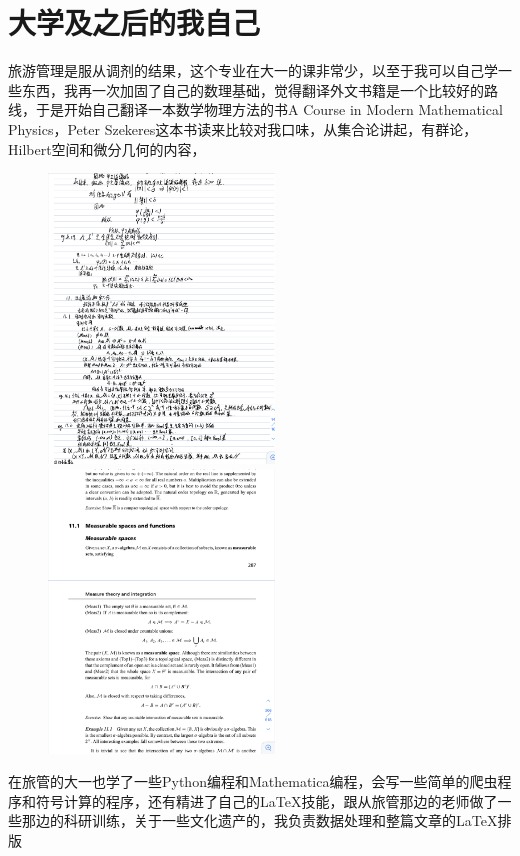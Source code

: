 \documentclass[hyperref,UTF8]{ctexart}
\begin{document}
\section{大学及之后的我自己}
旅游管理是服从调剂的结果，这个专业在大一的课非常少，以至于我可以自己学一些东西，我再一次加固了自己的数理基础，觉得翻译外文书籍是一个比较好的路线，于是开始自己翻译一本数学物理方法的书A Course in Modern Mathematical Physics，Peter Szekeres这本书读来比较对我口味，从集合论讲起，有群论， Hilbert空间和微分几何的内容，
\begin{figure}[H]
    \centering
    \includegraphics[width=6cm]{690A1E73E094CE8F4FB7D0F57BCEEF22.png}
    \includegraphics[width=6cm]{9DAFEFAC378DD8114C15D0D3970E29B2.png}
\end{figure}
在旅管的大一也学了一些Python编程和Mathematica编程，会写一些简单的爬虫程序和符号计算的程序，还有精进了自己的\LaTeX 技能，跟从旅管那边的老师做了一些那边的科研训练，关于一些文化遗产的，我负责数据处理和整篇文章的\LaTeX 排版
\end{document}
